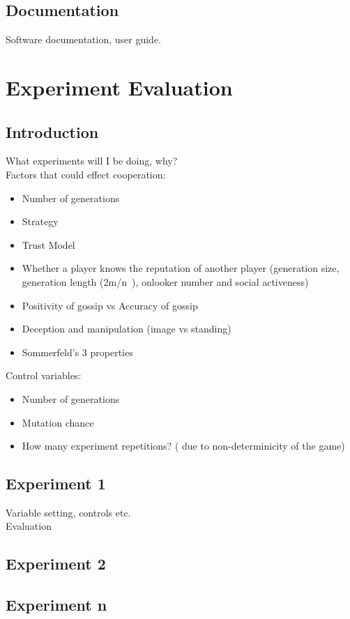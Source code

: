 \documentclass[]{final_report}
\begin{document}
\section{Documentation}
Software documentation, user guide.

\chapter{Experiment Evaluation}
\section{Introduction}
What experiments will I be doing, why?\\
Factors that could effect cooperation:
\begin{itemize}
	\item Number of generations
	\item Strategy
	\item Trust Model
	\item Whether a player knows the reputation of another player (generation size, generation length (2m/n~\cite{evol_indirect_image}), onlooker number and social activeness)
	\item Positivity of gossip vs Accuracy of gossip
	\item Deception and manipulation (image vs standing)
	\item Sommerfeld's 3 properties
\end{itemize}
Control variables:
\begin{itemize}
	\item Number of generations
	\item Mutation chance
	\item How many experiment repetitions? ( due to non-determinicity of the game)
\end{itemize}


\section{Experiment 1}
Variable setting, controls etc.\\
Evaluation

\section{Experiment 2}

\section{Experiment n}
\end{document}
